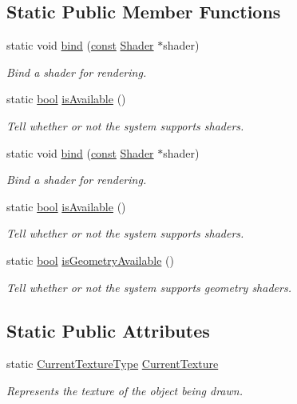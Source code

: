 \subsection*{Static Public Member Functions}
\begin{DoxyCompactItemize}
\item 
static void \hyperlink{classsf_1_1_shader_a09778f78afcbeb854d608c8dacd8ea30}{bind} (\hyperlink{term__entry_8h_a57bd63ce7f9a353488880e3de6692d5a}{const} \hyperlink{classsf_1_1_shader}{Shader} $\ast$shader)
\begin{DoxyCompactList}\small\item\em Bind a shader for rendering. \end{DoxyCompactList}\item 
static \hyperlink{term__entry_8h_a002004ba5d663f149f6c38064926abac}{bool} \hyperlink{classsf_1_1_shader_ad22474690bafe4a305c1b9826b1bd86a}{is\-Available} ()
\begin{DoxyCompactList}\small\item\em Tell whether or not the system supports shaders. \end{DoxyCompactList}\item 
static void \hyperlink{classsf_1_1_shader_a09778f78afcbeb854d608c8dacd8ea30}{bind} (\hyperlink{term__entry_8h_a57bd63ce7f9a353488880e3de6692d5a}{const} \hyperlink{classsf_1_1_shader}{Shader} $\ast$shader)
\begin{DoxyCompactList}\small\item\em Bind a shader for rendering. \end{DoxyCompactList}\item 
static \hyperlink{term__entry_8h_a002004ba5d663f149f6c38064926abac}{bool} \hyperlink{classsf_1_1_shader_ad22474690bafe4a305c1b9826b1bd86a}{is\-Available} ()
\begin{DoxyCompactList}\small\item\em Tell whether or not the system supports shaders. \end{DoxyCompactList}\item 
static \hyperlink{term__entry_8h_a002004ba5d663f149f6c38064926abac}{bool} \hyperlink{classsf_1_1_shader_a45db14baf1bbc688577f81813b1fce96}{is\-Geometry\-Available} ()
\begin{DoxyCompactList}\small\item\em Tell whether or not the system supports geometry shaders. \end{DoxyCompactList}\end{DoxyCompactItemize}
\subsection*{Static Public Attributes}
\begin{DoxyCompactItemize}
\item 
static \hyperlink{structsf_1_1_shader_1_1_current_texture_type}{Current\-Texture\-Type} \hyperlink{classsf_1_1_shader_ad679e434fc4f1a1af65f3815b2310fb5}{Current\-Texture}
\begin{DoxyCompactList}\small\item\em Represents the texture of the object being drawn. \end{DoxyCompactList}\end{DoxyCompactItemize}


